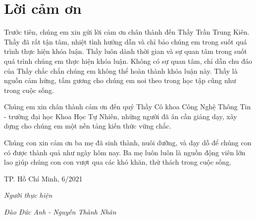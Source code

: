\chapter*{Lời cảm ơn}
\label{thanks}

Trước tiên, chúng em xin gửi lời cảm ơn chân thành đến Thầy Trần Trung Kiên.
Thầy đã rất tận tâm, nhiệt tình hướng dẫn và chỉ bảo chúng em trong suốt quá trình thực hiện khóa luận. 
Thầy luôn dành thời gian và sự quan tâm trong suốt quá trình chúng em thực hiện khóa luận.
Không có sự quan tâm, chỉ dẫn chu đáo của Thầy chắc chắn chúng em không thể hoàn thành khóa luận này. Thầy là nguồn cảm hứng, tấm gương cho chúng em noi theo trong học tập cũng như trong cuộc sống.

Chúng em xin chân thành cảm ơn đến quý Thầy Cô khoa Công Nghệ Thông Tin - trường đại học Khoa Học Tự Nhiên, những người đã ân cần giảng dạy, xây dựng cho chúng em một nền tảng kiến thức vững chắc.

Chúng con xin cảm ơn ba mẹ đã sinh thành, nuôi dưỡng, và dạy dỗ để chúng con có được thành quả như ngày hôm nay. Ba mẹ luôn luôn là nguồn động viên lớn lao giúp chúng con con vượt qua các khó khăn, thử thách trong cuộc sống.


\hfill TP. Hồ Chí Minh, 6/2021

\hfill \textit{Người thực hiện}

\hfill \textit{Đào Đức Anh - Nguyễn Thành Nhân}
